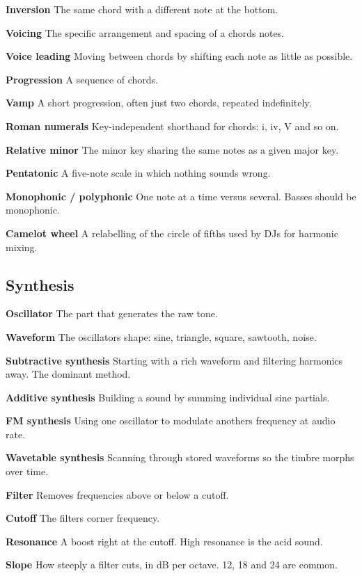 \textbf{Inversion} The same chord with a different note at the bottom.

\textbf{Voicing} The specific arrangement and spacing of a chord\textquotesingle s notes.

\textbf{Voice leading} Moving between chords by shifting each note as little as possible.

\textbf{Progression} A sequence of chords.

\textbf{Vamp} A short progression, often just two chords, repeated indefinitely.

\textbf{Roman numerals} Key-independent shorthand for chords: i, iv, V and so on.

\textbf{Relative minor} The minor key sharing the same notes as a given major key.

\textbf{Pentatonic} A five-note scale in which nothing sounds wrong.

\textbf{Monophonic / polyphonic} One note at a time versus several. Basses should be monophonic.

\textbf{Camelot wheel} A relabelling of the circle of fifths used by DJs for harmonic mixing.

\subsection{Synthesis}\label{th09_glossary-synthesis}

\textbf{Oscillator} The part that generates the raw tone.

\textbf{Waveform} The oscillator\textquotesingle s shape: sine, triangle, square, sawtooth, noise.

\textbf{Subtractive synthesis} Starting with a rich waveform and filtering harmonics away. The
dominant method.

\textbf{Additive synthesis} Building a sound by summing individual sine partials.

\textbf{FM synthesis} Using one oscillator to modulate another\textquotesingle s frequency at audio rate.

\textbf{Wavetable synthesis} Scanning through stored waveforms so the timbre morphs over time.

\textbf{Filter} Removes frequencies above or below a cutoff.

\textbf{Cutoff} The filter\textquotesingle s corner frequency.

\textbf{Resonance} A boost right at the cutoff. High resonance is the acid sound.

\textbf{Slope} How steeply a filter cuts, in dB per octave. 12, 18 and 24 are common.

